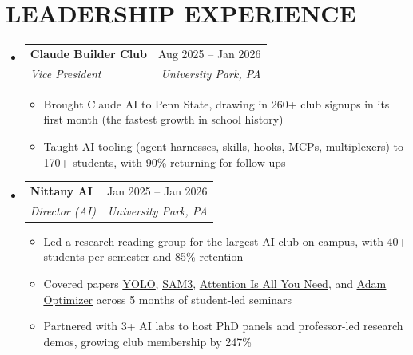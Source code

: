 \documentclass[letterpaper,11pt]{article}
\makeatletter
\newcommand{\resumeItem}[1]{
  \item\small{
    {#1 \vspace{-4pt}}
  }
}
\newcommand{\resumeSubheading}[4]{
  \item
    \begin{tabular*}{0.97\textwidth}[t]{l@{\extracolsep{\fill}}r}
      \textbf{#1} & #2 \\
      \textit{\small#3} & \textit{\small #4} \\
    \end{tabular*}\vspace{-7pt}
}
\newcommand{\resumeSubHeadingListStart}{\begin{itemize}[leftmargin=0.15in, label={}]}
\newcommand{\resumeSubHeadingListEnd}{\end{itemize}}
\newcommand{\resumeItemListStart}{\begin{itemize}}
\newcommand{\resumeItemListEnd}{\end{itemize}\vspace{-6pt}}
\makeatother
\begin{document}
\section{\textbf{LEADERSHIP EXPERIENCE}}
  \resumeSubHeadingListStart
    \resumeSubheading
      {Claude Builder Club}{Aug 2025 -- Jan 2026}
      {Vice President}{University Park, PA}
      \resumeItemListStart
              \resumeItem{Brought Claude AI to Penn State, drawing in 260+ club signups in its first month (the fastest growth in school history)}
              \resumeItem{Taught AI tooling (agent harnesses, skills, hooks, MCPs, multiplexers) to 170+ students, with 90\% returning for follow-ups}
        \resumeItemListEnd
    \resumeSubheading
      {Nittany AI}{Jan 2025 -- Jan 2026}
      {Director (AI)}{University Park, PA}
      \resumeItemListStart
              \resumeItem{Led a research reading group for the largest AI club on campus, with 40+ students per semester and 85\% retention}
              \resumeItem{Covered papers \href{https://arxiv.org/abs/1506.02640}{\underline{YOLO}}, \href{https://arxiv.org/abs/2511.16719}{\underline{SAM3}}, \href{https://arxiv.org/abs/1706.03762}{\underline{Attention Is All You Need}}, and \href{https://arxiv.org/abs/1412.6980}{\underline{Adam Optimizer}} across 5 months of student-led seminars}
              \resumeItem{Partnered with 3+ AI labs to host PhD panels and professor-led research demos, growing club membership by 247\%}
      \resumeItemListEnd
    \resumeSubHeadingListEnd

\end{document}
